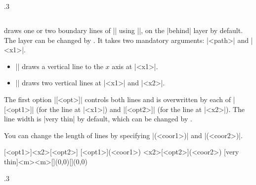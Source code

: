 \begin{tzcode}{.3}
{}
\end{tzcode}


\subsection{\protect{}}

\icmd{\tzfnarealine} draws one or two boundary lines of |\tzfnarea| using |\tzto|, on the |behind| layer by default. The layer can be changed by \icmd{\settzfnarealayer}.
It takes two mandatory arguments: |{<path>}| and |{<x1>}|.
\begin{itemize}\firmlist
\item || draws a vertical line to the $x$ axis at |<x1>|.
\item || draws two vertical lines at |<x1>| and |<x2>|.
\end{itemize}

The first option |[<opt>]| controls both lines and is overwritten by each of |[<opt1>]| (for the line at |<x1>|)  and |[<opt2>]| (for the line at |<x2>|).
The line width is |very thin| by default, which can be changed by \icmd{\settzfnarealinewith}.

You can change the length of lines by specifying |(<coor1>)| and |(<coor2>)|.

\begin{tzdef}{}
[<opt1>]{<x2>}[<opt2>]
[<opt1>](<coor1>)
                            {<x2>}[<opt2>](<coor2>)
  [very thin]{<m>}{<m>}[](0,0){}[](0,0)
\end{tzdef}


\begin{tzcode}{.3}
{}
\end{tzcode}

